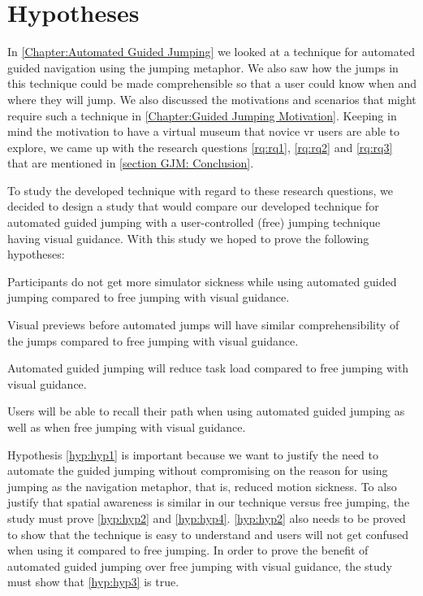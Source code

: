 \label{Chapter:Design and Procedure of the User Study}
\section{Hypotheses}
\label{section DPUS: Hypotheses}
In \cref{Chapter:Automated Guided Jumping} we looked at a technique for automated guided navigation using the jumping metaphor. We also saw how the jumps in this technique could be made comprehensible so that a user could know when and where they will jump. We also discussed the motivations and scenarios that might require such a technique in \cref{Chapter:Guided Jumping Motivation}. Keeping in mind the motivation to have a virtual museum that novice \acrshort{vr} users are able to explore, we came up with the research questions \cref{rq:rq1}, \cref{rq:rq2} and \cref{rq:rq3} that are mentioned in \cref{section GJM: Conclusion}.

To study the developed technique with regard to these research questions, we decided to design a study that would compare our developed technique for automated guided jumping with a user-controlled (free) jumping technique having visual guidance. With this study we hoped to prove the following hypotheses:

\begin{hypothesis}
	\label{hyp:hyp1}
	Participants do not get more simulator sickness while using automated guided jumping compared to free jumping with visual guidance.
\end{hypothesis}
\begin{hypothesis}
	\label{hyp:hyp2}
	Visual previews before automated jumps will have similar comprehensibility of the jumps compared to free jumping with visual guidance.
\end{hypothesis}
\begin{hypothesis}
	\label{hyp:hyp3}
	Automated guided jumping will reduce task load compared to free jumping with visual guidance.
\end{hypothesis}
\begin{hypothesis}
	\label{hyp:hyp4}
	Users will be able to recall their path when using automated guided jumping as well as when free jumping with visual guidance.
\end{hypothesis}

Hypothesis \cref{hyp:hyp1} is important because we want to justify the need to automate the guided jumping without compromising on the reason for using jumping as the navigation metaphor, that is, reduced motion sickness. To also justify that spatial awareness is similar in our technique versus free jumping, the study must prove \cref{hyp:hyp2} and \cref{hyp:hyp4}. \cref{hyp:hyp2}  also needs to be proved to show that the technique is easy to understand and users will not get confused when using it compared to free jumping. In order to prove the benefit of automated guided jumping over free jumping with visual guidance, the study must show that \cref{hyp:hyp3} is true.  

